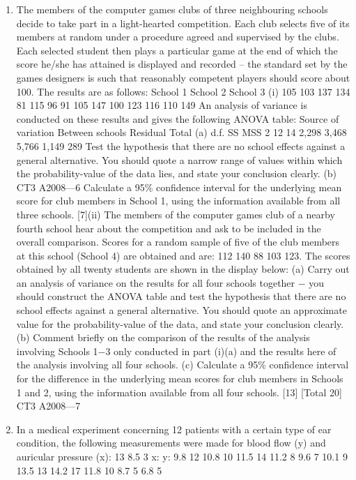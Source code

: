 \documentclass[a4paper,12pt]{article}
\begin{document}
\begin{enumerate}
\item The members of the computer games clubs of three neighbouring schools decide to
take part in a light-hearted competition. Each club selects five of its members at
random under a procedure agreed and supervised by the clubs. Each selected student
then plays a particular game at the end of which the score he/she has attained is
displayed and recorded – the standard set by the games designers is such that
reasonably competent players should score about 100.
The results are as follows:
School 1
School 2
School 3
(i)
105
103
137
134
81
115
96
91
105
147
100
123
116
110
149
An analysis of variance is conducted on these results and gives the following
ANOVA table:
Source of variation
Between schools
Residual
Total
(a)
d.f. SS MSS
2
12
14 2,298
3,468
5,766 1,149
289
Test the hypothesis that there are no school effects against a general
alternative.
You should quote a narrow range of values within which the
probability-value of the data lies, and state your conclusion clearly.
(b)
CT3 A2008—6
Calculate a 95\% confidence interval for the underlying mean score for
club members in School 1, using the information available from all
three schools.
[7](ii)
The members of the computer games club of a nearby fourth school hear about
the competition and ask to be included in the overall comparison. Scores for a
random sample of five of the club members at this school (School 4) are
obtained and are:
112 140 88 103 123.
The scores obtained by all twenty students are shown in the display below:
(a)
Carry out an analysis of variance on the results for all four schools
together − you should construct the ANOVA table and test the
hypothesis that there are no school effects against a general alternative.
You should quote an approximate value for the probability-value of the
data, and state your conclusion clearly.
(b) Comment briefly on the comparison of the results of the analysis
involving Schools 1−3 only conducted in part (i)(a) and the results here
of the analysis involving all four schools.
(c) Calculate a 95\% confidence interval for the difference in the
underlying mean scores for club members in Schools 1 and 2, using the
information available from all four schools.
[13]
[Total 20]
CT3 A2008—7
\item In a medical experiment concerning 12 patients with a certain type of ear condition,
the following measurements were made for blood flow (y) and auricular pressure (x):
13
8.5
3
x:
y:
9.8
12
10.8
10
11.5
14
11.2
8
9.6
7
10.1
9
13.5
13
14.2
17
11.8
10
8.7
5
6.8
5


\end{enumerate}
\end{document}
